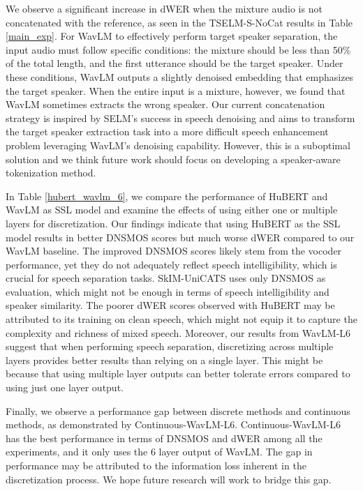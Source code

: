 \documentclass[conference]{IEEEtran}
\begin{document}
We observe a significant increase in dWER when the mixture audio is not concatenated with the reference, as seen in the TSELM-S-NoCat results in Table \ref{main_exp}. For WavLM to effectively perform target speaker separation, the input audio must follow specific conditions: the mixture should be less than 50\% of the total length, and the first utterance should be the target speaker. Under these conditions, WavLM outputs a slightly denoised embedding that emphasizes the target speaker. When the entire input is a mixture, however, we found that WavLM sometimes extracts the wrong speaker.
Our current concatenation strategy is inspired by SELM's \cite{selm} success in speech denoising and aims to transform the target speaker extraction task into a more difficult speech enhancement problem leveraging WavLM's denoising capability. However, this is a suboptimal solution and we think future work should focus on developing a speaker-aware tokenization method. 

In Table \ref{hubert_wavlm_6}, we compare the performance of HuBERT and WavLM as SSL model and examine the effects of using either one or multiple layers for discretization. Our findings indicate that using HuBERT as the SSL model results in better DNSMOS scores but much worse dWER compared to our WavLM baseline. The improved DNSMOS scores likely stem from the vocoder performance, yet they do not adequately reflect speech intelligibility, which is crucial for speech separation tasks. SkIM-UniCATS uses only DNSMOS as evaluation, which might not be enough 
in terms of speech intelligibility and speaker similarity.
The poorer dWER scores observed with HuBERT may be attributed to its training on clean speech, which might not equip it to capture the complexity and richness of mixed speech. Moreover, our results from WavLM-L6 suggest that when performing speech separation, discretizing across multiple layers provides better results than relying on a single layer.  This might be because that using multiple layer outputs can better tolerate errors compared to using just one layer output.

Finally, we observe a performance gap between discrete methods and continuous methods, as demonstrated by Continuous-WavLM-L6.
Continuous-WavLM-L6 has the best performance in terms of DNSMOS and dWER among all the experiments, and it only uses the 6 layer output of WavLM. 
The gap in performance may be attributed to the information loss inherent in the discretization process. 
We hope future research will work to bridge this gap.   
\end{document}
